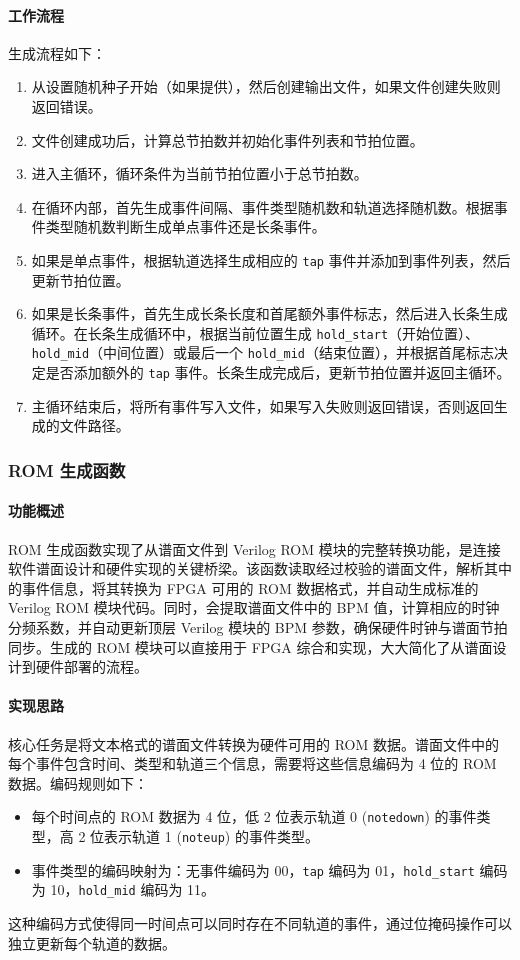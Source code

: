\documentclass[12pt, a4paper]{article}
\begin{document}
\paragraph{工作流程}
生成流程如下：
\begin{enumerate}
    \item 从设置随机种子开始（如果提供），然后创建输出文件，如果文件创建失败则返回错误。
    \item 文件创建成功后，计算总节拍数并初始化事件列表和节拍位置。
    \item 进入主循环，循环条件为当前节拍位置小于总节拍数。
    \item 在循环内部，首先生成事件间隔、事件类型随机数和轨道选择随机数。根据事件类型随机数判断生成单点事件还是长条事件。
    \item 如果是单点事件，根据轨道选择生成相应的 \texttt{tap} 事件并添加到事件列表，然后更新节拍位置。
    \item 如果是长条事件，首先生成长条长度和首尾额外事件标志，然后进入长条生成循环。在长条生成循环中，根据当前位置生成 \texttt{hold\_start}（开始位置）、\texttt{hold\_mid}（中间位置）或最后一个 \texttt{hold\_mid}（结束位置），并根据首尾标志决定是否添加额外的 \texttt{tap} 事件。长条生成完成后，更新节拍位置并返回主循环。
    \item 主循环结束后，将所有事件写入文件，如果写入失败则返回错误，否则返回生成的文件路径。
\end{enumerate}

\subsubsection{ROM 生成函数}

\paragraph{功能概述}
ROM 生成函数实现了从谱面文件到 Verilog ROM 模块的完整转换功能，是连接软件谱面设计和硬件实现的关键桥梁。该函数读取经过校验的谱面文件，解析其中的事件信息，将其转换为 FPGA 可用的 ROM 数据格式，并自动生成标准的 Verilog ROM 模块代码。同时，会提取谱面文件中的 BPM 值，计算相应的时钟分频系数，并自动更新顶层 Verilog 模块的 BPM 参数，确保硬件时钟与谱面节拍同步。生成的 ROM 模块可以直接用于 FPGA 综合和实现，大大简化了从谱面设计到硬件部署的流程。

\paragraph{实现思路}
核心任务是将文本格式的谱面文件转换为硬件可用的 ROM 数据。谱面文件中的每个事件包含时间、类型和轨道三个信息，需要将这些信息编码为 4 位的 ROM 数据。编码规则如下：
\begin{itemize}
    \item 每个时间点的 ROM 数据为 4 位，低 2 位表示轨道 0 (\texttt{notedown}) 的事件类型，高 2 位表示轨道 1 (\texttt{noteup}) 的事件类型。
    \item 事件类型的编码映射为：无事件编码为 00，\texttt{tap} 编码为 01，\texttt{hold\_start} 编码为 10，\texttt{hold\_mid} 编码为 11。
\end{itemize}
这种编码方式使得同一时间点可以同时存在不同轨道的事件，通过位掩码操作可以独立更新每个轨道的数据。
\end{document}
